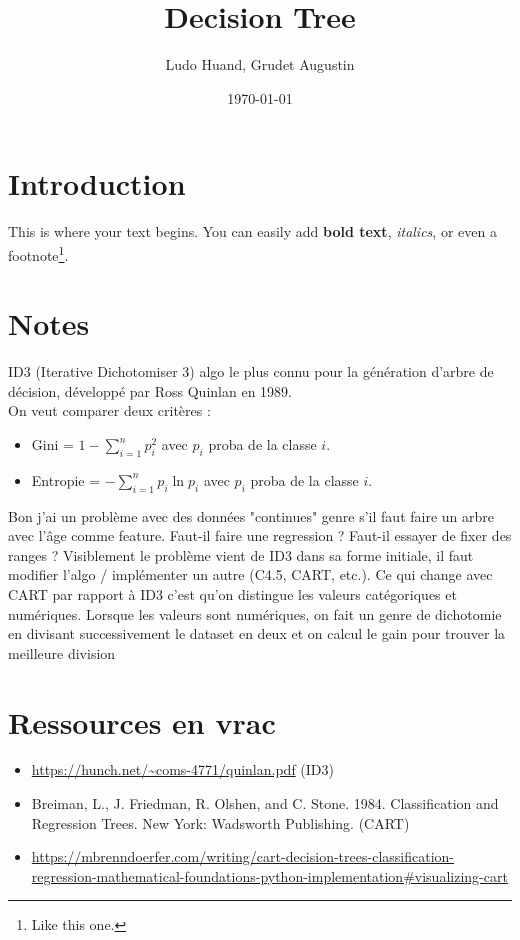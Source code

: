 \documentclass[11pt]{article}
\title{Decision Tree}
\author{Ludo Huand, Grudet Augustin}
\date{\today}
\begin{document}
\maketitle

\section{Introduction}
This is where your text begins. You can easily add \textbf{bold text}, \textit{italics}, or even a footnote\footnote{Like this one.}.

\section{Notes}
ID3 (Iterative Dichotomiser 3) algo le plus connu pour la génération d'arbre de décision, développé par Ross Quinlan en 1989. \\
On veut comparer deux critères :
\begin{itemize}
    \item Gini = $1 - \sum_{i=1}^n p_i^2$ avec $p_i$ proba de la classe $i$.
    \item Entropie = $- \sum_{i=1}^n p_i \ln{p_i}$ avec $p_i$ proba de la classe $i$.
\end{itemize}

Bon j'ai un problème avec des données "continues" genre s'il faut faire un arbre avec l'âge comme feature. Faut-il faire une regression ? Faut-il essayer de fixer des ranges ? Visiblement le problème vient de ID3 dans sa forme initiale, il faut modifier l'algo / implémenter un autre (C4.5, CART, etc.).
Ce qui change avec CART par rapport à ID3 c'est qu'on distingue les valeurs catégoriques et numériques. Lorsque les valeurs sont numériques, on fait un genre de dichotomie en divisant successivement le dataset en deux et on calcul le gain pour trouver la meilleure division

\section{Ressources en vrac}

\begin{itemize}
	\item \url{https://hunch.net/~coms-4771/quinlan.pdf} (ID3)
	\item Breiman, L., J. Friedman, R. Olshen, and C. Stone. 1984. Classification and Regression Trees. New York: Wadsworth Publishing. (CART)
	\item \url{https://mbrenndoerfer.com/writing/cart-decision-trees-classification-regression-mathematical-foundations-python-implementation#visualizing-cart}
\end{itemize}
\end{document}

